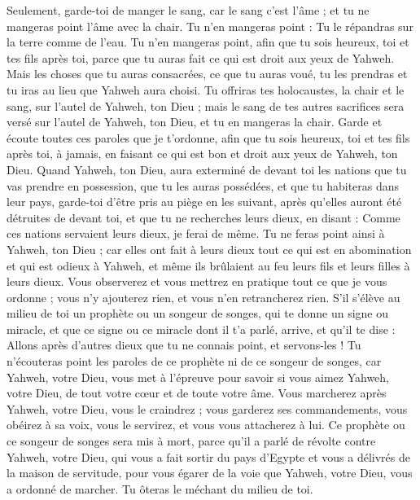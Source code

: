 \begin{multicols}{2}
Seulement, garde-toi de manger le sang, car le sang c'est l'âme ; et tu ne mangeras point l'âme avec la chair.
Tu n'en mangeras point : Tu le répandras sur la terre comme de l'eau.
Tu n'en mangeras point, afin que tu sois heureux, toi et tes fils après toi, parce que tu auras fait ce qui est droit aux yeux de Yahweh.
Mais les choses que tu auras consacrées, ce que tu auras voué, tu les prendras et tu iras au lieu que Yahweh aura choisi.
Tu offriras tes holocaustes, la chair et le sang, sur l'autel de Yahweh, ton Dieu ; mais le sang de tes autres sacrifices sera versé sur l'autel de Yahweh, ton Dieu, et tu en mangeras la chair.
Garde et écoute toutes ces paroles que je t'ordonne, afin que tu sois heureux, toi et tes fils après toi, à jamais, en faisant ce qui est bon et droit aux yeux de Yahweh, ton Dieu.
Quand Yahweh, ton Dieu, aura exterminé de devant toi les nations que tu vas prendre en possession, que tu les auras possédées, et que tu habiteras dans leur pays,
garde-toi d'être pris au piège en les suivant, après qu'elles auront été détruites de devant toi, et que tu ne recherches leurs dieux, en disant : Comme ces nations servaient leurs dieux, je ferai de même.
Tu ne feras point ainsi à Yahweh, ton Dieu ; car elles ont fait à leurs dieux tout ce qui est en abomination et qui est odieux à Yahweh, et même ils brûlaient au feu leurs fils et leurs filles à leurs dieux.
Vous observerez et vous mettrez en pratique tout ce que je vous ordonne ; vous n'y ajouterez rien, et vous n'en retrancherez rien.
\VerseOne{}S'il s'élève au milieu de toi un prophète ou un songeur de songes, qui te donne un signe ou miracle,
et que ce signe ou ce miracle dont il t'a parlé, arrive, et qu'il te dise : Allons après d'autres dieux que tu ne connais point, et servons-les !
Tu n'écouteras point les paroles de ce prophète ni de ce songeur de songes, car Yahweh, votre Dieu, vous met à l'épreuve pour savoir si vous aimez Yahweh, votre Dieu, de tout votre cœur et de toute votre âme.
Vous marcherez après Yahweh, votre Dieu, vous le craindrez ; vous garderez ses commandements, vous obéirez à sa voix, vous le servirez, et vous vous attacherez à lui.
Ce prophète ou ce songeur de songes sera mis à mort, parce qu'il a parlé de révolte contre Yahweh, votre Dieu, qui vous a fait sortir du pays d'Egypte et vous a délivrés de la maison de servitude, pour vous égarer de la voie que Yahweh, votre Dieu, vous a ordonné de marcher. Tu ôteras le méchant du milieu de toi.

\end{multicols}
